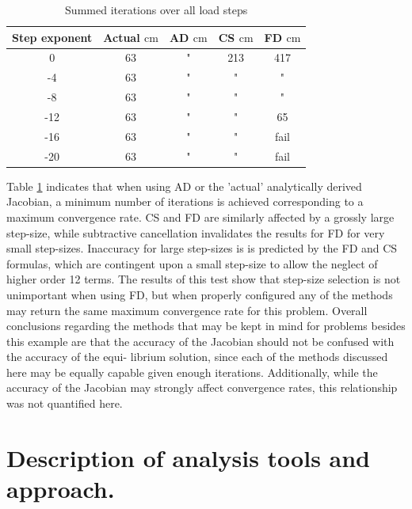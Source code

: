\documentclass[preprint,12pt]{elsarticle}
\begin{document}
\begin{table}[!ht]    
  \centering
        \caption{Summed iterations over all load steps} \label{tab:ConvergenceStudy}   
        \begin{tabular}{c c c c c}
         \toprule
         Step exponent & Actual $\si{\centi\meter}$ & AD $\si{\centi\meter}$ & CS $\si{\centi\meter}$ & FD $\si{\centi\meter}$\\ 
        \midrule
        0 & 63 & " & 213 & 417\\
        -4 & 63 & " & " & "\\
        -8 & 63& " & " & "\\
        -12 &63& " & " &  65\\
        -16 &63& " & " & fail\\
        -20 &63& " & " & fail\\
        \bottomrule
    \end{tabular}
\end{table}

Table \ref{tab:ConvergenceStudy} indicates that when using AD or the 'actual'
analytically derived Jacobian, a minimum number of iterations is achieved
corresponding to a maximum convergence rate. CS and FD are similarly affected
by a grossly large step-size, while subtractive cancellation invalidates the
results for FD for very small step-sizes. Inaccuracy for large step-sizes is is
predicted by the FD and CS formulas, which are contingent upon a small
step-size to allow the neglect of higher order 12 terms. The results of this
test show that step-size selection is not unimportant when using FD, but when
properly configured any of the methods may return the same maximum convergence
rate for this problem.  Overall conclusions regarding the methods that may be
kept in mind for problems besides this example are that the accuracy of the
Jacobian should not be confused with the accuracy of the equi- librium
solution, since each of the methods discussed here may be equally capable given
enough iterations. Additionally, while the accuracy of the Jacobian may
strongly affect convergence rates, this relationship was not quantified here.


\section{Description of analysis tools and approach.} 
%
\end{document}
